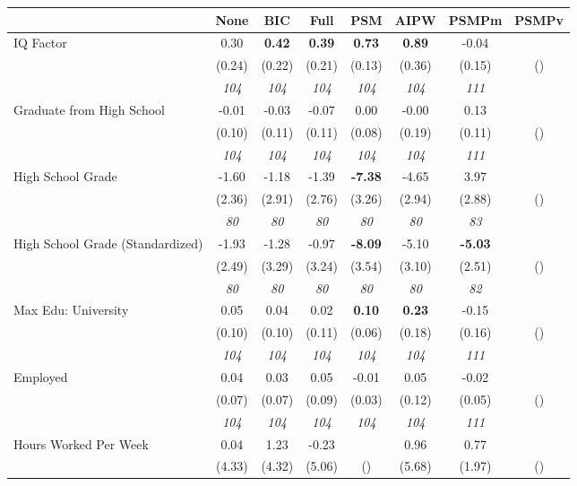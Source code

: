 \begin{tabular}{l c c c c c c c}
\toprule
 & None & BIC & Full & PSM & AIPW & PSMPm & PSMPv \\
\midrule
IQ Factor & 0.30 & \textbf{ 0.42 } & \textbf{ 0.39 } & \textbf{0.73} & \textbf{0.89} & -0.04 & \\
& (0.24) & (0.22) & (0.21) & (0.13) & (0.36) & (0.15) & () \\
& \textit{ 104 } & \textit{ 104 } & \textit{ 104 } & \textit{ 104 } & \textit{ 104 } & \textit{ 111 } & \\
Graduate from High School & -0.01 & -0.03 & -0.07 & 0.00 & -0.00 & 0.13 & \\
& (0.10) & (0.11) & (0.11) & (0.08) & (0.19) & (0.11) & () \\
& \textit{ 104 } & \textit{ 104 } & \textit{ 104 } & \textit{ 104 } & \textit{ 104 } & \textit{ 111 } & \\
High School Grade & -1.60 & -1.18 & -1.39 & \textbf{-7.38} & -4.65 & 3.97 & \\
& (2.36) & (2.91) & (2.76) & (3.26) & (2.94) & (2.88) & () \\
& \textit{ 80 } & \textit{ 80 } & \textit{ 80 } & \textit{ 80 } & \textit{ 80 } & \textit{ 83 } & \\
High School Grade (Standardized) & -1.93 & -1.28 & -0.97 & \textbf{-8.09} & -5.10 & \textbf{-5.03} & \\
& (2.49) & (3.29) & (3.24) & (3.54) & (3.10) & (2.51) & () \\
& \textit{ 80 } & \textit{ 80 } & \textit{ 80 } & \textit{ 80 } & \textit{ 80 } & \textit{ 82 } & \\
Max Edu: University & 0.05 & 0.04 & 0.02 & \textbf{0.10} & \textbf{0.23} & -0.15 & \\
& (0.10) & (0.10) & (0.11) & (0.06) & (0.18) & (0.16) & () \\
& \textit{ 104 } & \textit{ 104 } & \textit{ 104 } & \textit{ 104 } & \textit{ 104 } & \textit{ 111 } & \\
Employed & 0.04 & 0.03 & 0.05 & -0.01 & 0.05 & -0.02 & \\
& (0.07) & (0.07) & (0.09) & (0.03) & (0.12) & (0.05) & () \\
& \textit{ 104 } & \textit{ 104 } & \textit{ 104 } & \textit{ 104 } & \textit{ 104 } & \textit{ 111 } & \\
Hours Worked Per Week & 0.04 & 1.23 & -0.23 & & 0.96 & 0.77 & \\
& (4.33) & (4.32) & (5.06) & () & (5.68) & (1.97) & () \\

\end{tabular}
